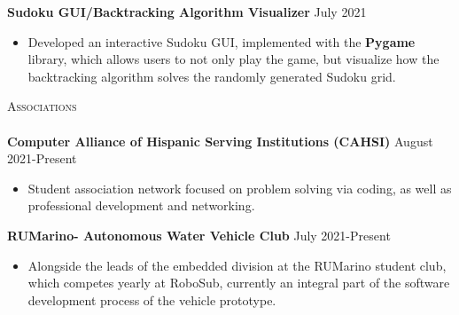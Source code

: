 \documentclass[a4paper]{article}
\newcommand{\lineunder} {
    \vspace*{-8pt} \\
    \hspace*{-18pt} \hrulefill \\
}
\newcommand{\header} [1] {
    {\hspace*{-18pt}\vspace*{6pt} \textsc{#1}}
    \vspace*{-6pt} \lineunder
}
\begin{document}
{\textbf{Sudoku GUI/Backtracking Algorithm Visualizer}} \hfill July 2021  \\
\vspace{-1.5mm}

\begin{itemize} \itemsep -1pt
\item Developed an interactive Sudoku GUI, implemented with the \textbf{Pygame} library, which allows users to not only play the game, but visualize how the backtracking algorithm solves the randomly generated Sudoku grid.
\end{itemize}

\header{Associations}

\vspace{-1mm} \textbf{Computer Alliance of Hispanic Serving Institutions (CAHSI)} \hfill August 2021-Present\\
\begin{itemize} \itemsep -1pt
\vspace{-2mm}
\item Student association network focused on problem solving via coding, as well as professional development and networking. \\
\end{itemize}

\vspace{-2mm}
\textbf{RUMarino- Autonomous Water Vehicle Club} \hfill July 2021-Present \\ 
\vspace{-2mm}
\begin{itemize} \itemsep -1pt
\item Alongside the leads of the embedded division at the RUMarino student club, which competes yearly at RoboSub, currently an integral part of the software development process of the vehicle prototype. \\ 
\end{itemize}
 


\ 
\end{document}
